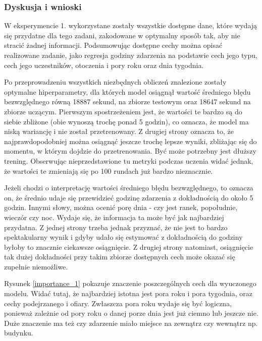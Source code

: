 \documentclass{classrep}
\begin{document}
{{            \subsubsection{Dyskusja i wnioski} {
                W eksperymencie 1. wykorzystane zostały wszystkie dostępne dane, które
                wydają się przydatne dla tego zadani, zakodowane w optymalny sposób
                tak, aby nie stracić żadnej informacji. Podsumowując dostępne cechy
                można opisać realizowane zadanie, jako regresja godziny zdarzenia na
                podstawie cech jego typu, cech jego uczestników, otoczenia i pory roku
                oraz dnia tygodnia.

                Po przeprowadzeniu wszystkich niezbędnych obliczeń znalezione zostały
                optymalne hiperparametry, dla których model osiągnął wartość średniego
                błędu bezwzględnego równą 18887 sekund, na zbiorze testowym oraz 18647
                sekund na zbiorze uczącym. Pierwszym spostrzeżeniem jest, że wartości
                te bardzo są do siebie zbliżone (obie wynoszą trochę ponad 5 godzin),
                co oznacza, że model ma niską wariancję i nie został przetrenowany. Z
                drugiej strony oznacza to, że najprawdopodobniej można osiągnąć jeszcze
                trochę lepsze wyniki, zbliżając się do momentu, w którym dojdzie do
                przetrenowania. Być może potrzebny jest dłuższy trening. Obserwując
                nieprzedstawione tu metryki podczas uczenia widać jednak, że wartości
                te zmieniają się po 100 rundach już bardzo nieznacznie.

                Jeżeli chodzi o interpretację wartości średniego błędu bezwzględnego,
                to oznacza on, że średnio udaje się przewidzieć godzinę zdarzenia z
                dokładnością do około 5 godzin. Innymi słowy, można ocenić porę dnia -
                czy jest ranek, popołudnie, wieczór czy noc. Wydaje się, że informacja
                ta może być jak najbardziej przydatna. Z jednej strony trzeba jednak
                przyznać, że nie jest to bardzo spektakularny wynik i gdyby udało się
                estymować z dokładnością do godziny byłoby to znacznie ciekawsze
                osiągnięcie. Z drugiej strony natomiast, osiągnięcie tak dużej
                dokładności przy takim zbiorze dostępnych cech może okazać się zupełnie
                niemożliwe.

                Rysunek \ref{importance_1} pokazuje znaczenie poszczególnych cech dla
                wyuczonego modelu. Widać tutaj, że najbardziej istotna jest pora roku i
                pora tygodnia, oraz cechy podejrzanego i ofiary. Zwłaszcza pora roku
                wydaje się być logiczna, ponieważ zależnie od pory roku o danej porze
                dnia jest już ciemno lub jeszcze nie. Duże znaczenie ma też czy
                zdarzenie miało miejsce na zewnątrz czy wewnątrz np. budynku.

}}}
\end{document}
